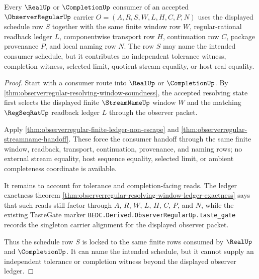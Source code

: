 \begin{theorem}
\label{thm:observerregular-schedule-lock-real-completion}
Every $\RealUp$ or $\CompletionUp$ consumer of an accepted $\ObserverRegularUp$ carrier $O=(A,R,S,W,L,H,C,P,N)$ uses the displayed schedule row $S$ together with the same finite window row $W$, regular-rational readback ledger $L$, componentwise transport row $H$, continuation row $C$, package provenance $P$, and local naming row $N$. The row $S$ may name the intended consumer schedule, but it contributes no independent tolerance witness, completion witness, selected limit, quotient stream equality, or host real equality.
\end{theorem}
\begin{proof}
Start with a consumer route into $\RealUp$ or $\CompletionUp$. By \autoref{thm:observerregular-resolving-window-soundness}, the accepted resolving state first selects the displayed finite $\StreamNameUp$ window $W$ and the matching $\RegSeqRatUp$ readback ledger $L$ through the observer packet.

Apply \autoref{thm:observerregular-finite-ledger-non-escape} and \autoref{thm:observerregular-streamname-handoff}. These force the consumer handoff through the same finite window, readback, transport, continuation, provenance, and naming rows; no external stream equality, host sequence equality, selected limit, or ambient completeness coordinate is available.

It remains to account for tolerance and completion-facing reads. The ledger exactness theorem \autoref{thm:observerregular-resolving-window-ledger-exactness} says that such reads still factor through $A$, $R$, $W$, $L$, $H$, $C$, $P$, and $N$, while the existing TasteGate marker \texttt{BEDC.Derived.ObserverRegularUp.taste\_gate} records the singleton carrier alignment for the displayed observer packet.

Thus the schedule row $S$ is locked to the same finite rows consumed by $\RealUp$ and $\CompletionUp$. It can name the intended schedule, but it cannot supply an independent tolerance or completion witness beyond the displayed observer ledger.
\end{proof}

